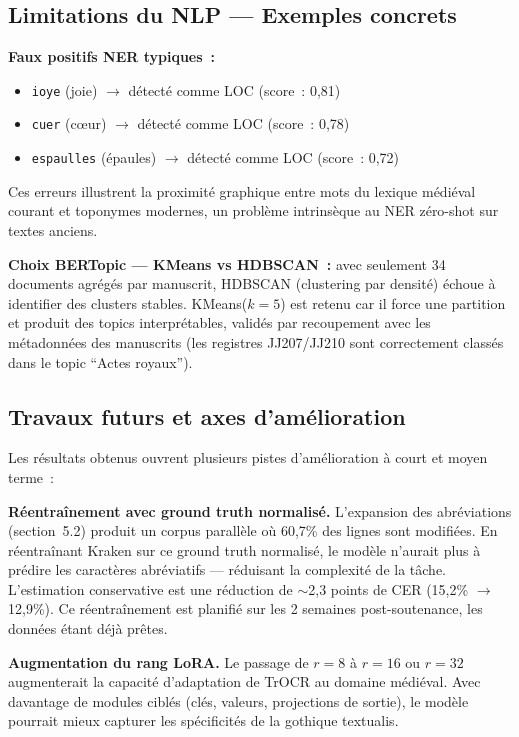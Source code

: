 \documentclass[11pt,a4paper]{article}
\begin{document}
\subsection{Limitations du NLP --- Exemples concrets}

\textbf{Faux positifs NER typiques~:}
\begin{itemize}[leftmargin=*, itemsep=1pt]
\item \texttt{ioye} (joie) $\rightarrow$ détecté comme LOC (score~: 0,81)
\item \texttt{cuer} (c\oe ur) $\rightarrow$ détecté comme LOC (score~: 0,78)
\item \texttt{espaulles} (épaules) $\rightarrow$ détecté comme LOC (score~: 0,72)
\end{itemize}
Ces erreurs illustrent la proximité graphique entre mots du lexique médiéval courant et toponymes modernes, un problème intrinsèque au NER zéro-shot sur textes anciens.

\textbf{Choix BERTopic --- KMeans vs HDBSCAN~:} avec seulement 34 documents agrégés par manuscrit, HDBSCAN (clustering par densité) échoue à identifier des clusters stables. KMeans($k=5$) est retenu car il force une partition et produit des topics interprétables, validés par recoupement avec les métadonnées des manuscrits (les registres JJ207/JJ210 sont correctement classés dans le topic ``Actes royaux'').

\subsection{Travaux futurs et axes d'amélioration}

Les résultats obtenus ouvrent plusieurs pistes d'amélioration à court et moyen terme~:

\textbf{Réentraînement avec ground truth normalisé.} L'expansion des abréviations (section~5.2) produit un corpus parallèle où 60,7\% des lignes sont modifiées. En réentraînant Kraken sur ce ground truth normalisé, le modèle n'aurait plus à prédire les caractères abréviatifs --- réduisant la complexité de la tâche. L'estimation conservative est une réduction de $\sim$2,3 points de CER (15,2\% $\rightarrow$ 12,9\%). Ce réentraînement est planifié sur les 2 semaines post-soutenance, les données étant déjà prêtes.

\textbf{Augmentation du rang LoRA.} Le passage de $r=8$ à $r=16$ ou $r=32$ augmenterait la capacité d'adaptation de TrOCR au domaine médiéval. Avec davantage de modules ciblés (clés, valeurs, projections de sortie), le modèle pourrait mieux capturer les spécificités de la gothique textualis.
\end{document}
